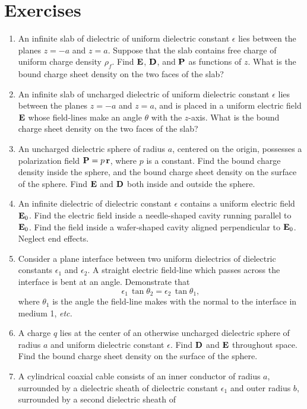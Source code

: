 {\small
\section{Exercises}
\renewcommand{\theenumi}{6.\arabic{enumi}}
\begin{enumerate}
\item An infinite slab of dielectric of uniform dielectric constant $\epsilon$ lies
between the planes $z=-a$ and $z=a$. Suppose that the slab contains
free charge of uniform charge density $\rho_f$. Find ${\bf E}$, ${\bf D}$,
and ${\bf P}$ as functions of $z$. What is the bound charge sheet
density on the two faces of the slab?
\item An infinite slab of uncharged dielectric of uniform dielectric constant $\epsilon$ lies
between the planes $z=-a$ and $z=a$, and is placed in a uniform
electric field ${\bf E}$ whose field-lines make an angle $\theta$ with the $z$-axis. What is the bound charge sheet
density on the two faces of the slab?
\item An uncharged  dielectric sphere of radius $a$, centered on the origin, possesses a polarization field ${\bf P} = p\,{\bf r}$, where $p$ is a constant. Find the bound charge density inside the sphere, and the bound charge sheet
density on the surface of the sphere.
Find ${\bf E}$ and ${\bf D}$ both inside and outside the sphere.
\item An infinite dielectric of dielectric constant $\epsilon$ contains
a uniform electric field ${\bf E}_0$.  Find the electric field inside
a needle-shaped cavity running parallel to ${\bf E}_0$. Find the field
inside a wafer-shaped cavity aligned perpendicular to ${\bf E}_0$. Neglect
end effects.
\item Consider a plane interface between two uniform dielectrics of dielectric
constants $\epsilon_1$ and $\epsilon_2$. A straight electric field-line 
which passes across the interface is bent at an angle. Demonstrate that
$$
\epsilon_1\,\tan\theta_2= \epsilon_2\,\tan\theta_1,
$$
where $\theta_1$ is the angle the field-line makes with the
normal to the interface in medium 1, {\em etc.}
\item A charge $q$ lies at the center of an otherwise uncharged dielectric sphere of radius $a$
and uniform dielectric constant $\epsilon$. Find ${\bf D}$ and ${\bf E}$
throughout space. Find the bound charge sheet density on the surface of the
sphere.
\item A cylindrical coaxial cable consists of an inner conductor of radius $a$,
surrounded by a dielectric sheath of dielectric constant $\epsilon_1$ and outer radius $b$, surrounded  by a second dielectric sheath of

\end{enumerate}}

